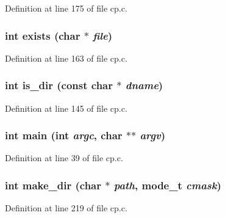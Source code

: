 Definition at line 175 of file cp.c.

\subsubsection[{exists}]{\setlength{\rightskip}{0pt plus 5cm}int exists (char $\ast$ {\em file})}\label{cp_8c_a436bca6fd78f0ec6e0b6a304affe17e6}


Definition at line 163 of file cp.c.

\subsubsection[{is\_\-dir}]{\setlength{\rightskip}{0pt plus 5cm}int is\_\-dir (const char $\ast$ {\em dname})}\label{cp_8c_a7791f3db8a56d9f73ddbd1a774023873}


Definition at line 145 of file cp.c.

\subsubsection[{main}]{\setlength{\rightskip}{0pt plus 5cm}int main (int {\em argc}, \/  char $\ast$$\ast$ {\em argv})}\label{cp_8c_a3c04138a5bfe5d72780bb7e82a18e627}


Definition at line 39 of file cp.c.

\subsubsection[{make\_\-dir}]{\setlength{\rightskip}{0pt plus 5cm}int make\_\-dir (char $\ast$ {\em path}, \/  mode\_\-t {\em cmask})}\label{cp_8c_a0462ccb9c57862690cefe3f130234f10}


Definition at line 219 of file cp.c.

